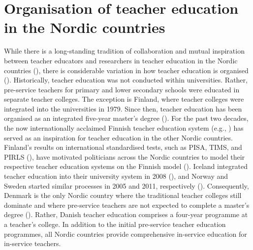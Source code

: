 \documentclass[output=paper]{langscibook}
\begin{document}
\section{Organisation of teacher education in the Nordic countries}\label{sec:reath:5}

While there is a long-standing tradition of collaboration and mutual inspiration between teacher educators and researchers in teacher education in the Nordic countries (\citealt{Elstad2020,HadzialicEtAl2017}), there is considerable variation in how teacher education is organised (\citealt{Elstad2020}). Historically, teacher education was not conducted within universities. Rather, pre-service teachers for primary and lower secondary schools were educated in separate teacher colleges. The exception is Finland, where teacher colleges were integrated into the universities in 1979. Since then, teacher education has been organised as an integrated five-year master’s degree (\citealt{Sahlberg2015}). For the past two decades, the now internationally acclaimed Finnish teacher education system (e.g., \citealt{Darling-HammondEtAl2017,Tatto2015}) has served as an inspiration for teacher education in the other Nordic countries. Finland’s results on international standardised tests, such as PISA, TIMS, and PIRLS (\citealt{Ahonen2021}), have motivated politicians across the Nordic countries to model their respective teacher education systems on the Finnish model (\citealt{Elstad2020}). Iceland integrated teacher education into their university system in 2008 (\citealt{Sigursson2020}), and Norway and Sweden started similar processes in 2005 and 2011, respectively (\citealt{Astrand2020,SkagenElstad2020}). Consequently, Denmark is the only Nordic country where the traditional teacher colleges still dominate and where pre-service teachers are not expected to complete a master’s degree (\citealt{MadsenJensen2020}). Rather, Danish teacher education comprises a four-year programme at a teacher’s college. In addition to the initial pre-service teacher education programmes, all Nordic countries provide comprehensive in-service education for in-service teachers.
\end{document}
